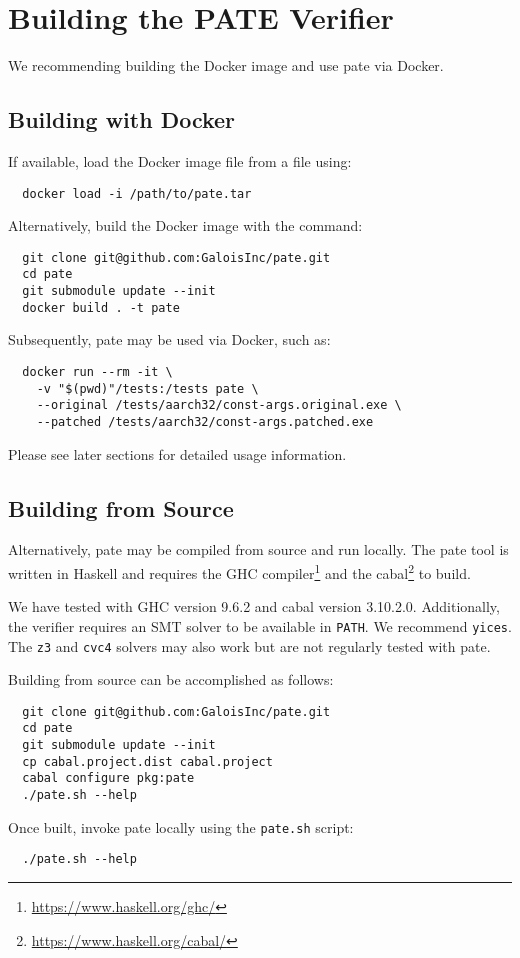 \section{Building the PATE Verifier}
\label{sec:build-pate-verif}

We recommending building the Docker image and use pate via Docker.

\subsection{Building with Docker}

If available, load the Docker image file from a file using:
\begin{verbatim}
  docker load -i /path/to/pate.tar
\end{verbatim}

Alternatively, build the Docker image with the command:

\begin{verbatim}
  git clone git@github.com:GaloisInc/pate.git
  cd pate
  git submodule update --init
  docker build . -t pate
\end{verbatim}

Subsequently, pate may be used via Docker, such as:

\begin{verbatim}
  docker run --rm -it \
    -v "$(pwd)"/tests:/tests pate \
    --original /tests/aarch32/const-args.original.exe \
    --patched /tests/aarch32/const-args.patched.exe
\end{verbatim}

Please see later sections for detailed usage information.

\subsection{Building from Source}

Alternatively, pate may be compiled from source and run locally.
The pate tool is written in Haskell and requires the GHC compiler\footnote{\url{https://www.haskell.org/ghc/}} and the cabal\footnote{\url{https://www.haskell.org/cabal/}} to build.

We have tested with GHC version 9.6.2 and cabal version 3.10.2.0.
Additionally, the verifier requires an SMT solver to be available in \texttt{PATH}.
We recommend \texttt{yices}.
The \texttt{z3} and \texttt{cvc4} solvers may also work but are not regularly tested with pate.

Building from source can be accomplished as follows:
\begin{verbatim}
  git clone git@github.com:GaloisInc/pate.git
  cd pate
  git submodule update --init
  cp cabal.project.dist cabal.project
  cabal configure pkg:pate
  ./pate.sh --help
\end{verbatim}

Once built, invoke pate locally using the \texttt{pate.sh} script:

\begin{verbatim}
  ./pate.sh --help
\end{verbatim}

